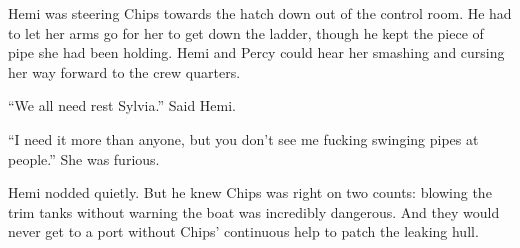 \documentclass[]{article}
\begin{document}
Hemi was steering Chips towards the hatch down out of the control room.
He had to let her arms go for her to get down the ladder, though he kept
the piece of pipe she had been holding. Hemi and Percy could hear her
smashing and cursing her way forward to the crew quarters.

``We all need rest Sylvia.'' Said Hemi.

``I need it more than anyone, but you don't see me fucking swinging
pipes at people.'' She was furious.

Hemi nodded quietly. But he knew Chips was right on two counts: blowing
the trim tanks without warning the boat was incredibly dangerous. And
they would never get to a port without Chips' continuous help to patch
the leaking hull.
\end{document}
